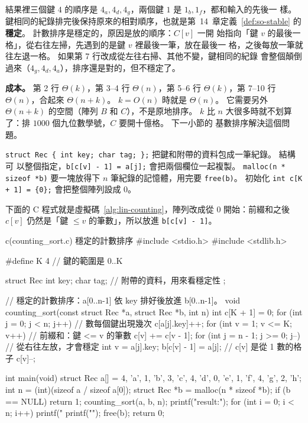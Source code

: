 結果裡三個鍵 $4$ 的順序是 $4_a, 4_d, 4_g$，兩個鍵 $1$ 是 $1_b, 1_f$，都和輸入的先後一
樣。 鍵相同的紀錄排完後保持原來的相對順序，也就是第~14~章定義~\ref{def:so-stable}
的\textbf{穩定}。 計數排序是穩定的，原因是放的順序：$C[v]$ 一開
始指向「鍵 $v$ 的最後一格」，從右往左掃，先遇到的是鍵 $v$ 裡最後一筆，放在最後一
格，之後每放一筆就往左退一格。 如果第 7 行改成從左往右掃、其他不變，鍵相同的紀錄
會整個顛倒過來（$4_g, 4_d, 4_a$），排序還是對的，但不穩定了。

\textbf{成本。} 第 2 行 $\Theta(k)$，第 3--4 行 $\Theta(n)$，第 5--6 行
$\Theta(k)$，第 7--10 行 $\Theta(n)$，合起來 $\Theta(n + k)$。 $k = O(n)$ 時就是
$\Theta(n)$。 它需要另外 $\Theta(n + k)$ 的空間（陣列 $B$ 和 $C$），不是原地排序。
$k$ 比 $n$ 大很多時就不划算了：排 $1000$ 個九位數學號，$C$ 要開十億格。 下一小節的
基數排序解決這個問題。

\begin{cbookrecap}[第~14~章結構、第~19~章 19.3 節]
\texttt{struct Rec \{ int key; char tag; \};} 把鍵和附帶的資料包成一筆紀錄。 結構可
以整個指定，\texttt{b[c[v] - 1] = a[j];} 會把兩個欄位一起複製。
\texttt{malloc(n * sizeof *b)} 要一塊放得下 $n$ 筆紀錄的記憶體，用完要
\texttt{free(b)}。 初始化 \texttt{int c[K + 1] = \{0\};} 會把整個陣列設成 $0$。
\end{cbookrecap}

下面的 C 程式就是虛擬碼~\ref{alg:lin-counting}，陣列改成從 $0$ 開始：前綴和之後
$c[v]$ 仍然是「鍵 $\le v$ 的筆數」，所以放進 \texttt{b[c[v] - 1]}。

\begin{example}[label=ex:lin-counting]{c}{(counting\_sort.c) 穩定的計數排序}
#include <stdio.h>
#include <stdlib.h>

#define K 4                       // 鍵的範圍是 0..K

struct Rec {
    int key;
    char tag;                     // 附帶的資料，用來看穩定性
};

// 穩定的計數排序：a[0..n-1] 依 key 排好後放進 b[0..n-1]。
void counting_sort(const struct Rec *a, struct Rec *b, int n)
{
    int c[K + 1] = {0};
    for (int j = 0; j < n; j++)          // 數每個鍵出現幾次
        c[a[j].key]++;
    for (int v = 1; v <= K; v++)         // 前綴和：鍵 <= v 的筆數
        c[v] += c[v - 1];
    for (int j = n - 1; j >= 0; j--) {   // 從右往左放，才會穩定
        int v = a[j].key;
        b[c[v] - 1] = a[j];              // c[v] 是從 1 數的格子
        c[v]--;
    }
}

int main(void)
{
    struct Rec a[] = {{4, 'a'}, {1, 'b'}, {3, 'c'}, {4, 'd'},
                      {0, 'e'}, {1, 'f'}, {4, 'g'}, {2, 'h'}};
    int n = (int)(sizeof a / sizeof a[0]);
    struct Rec *b = malloc(n * sizeof *b);
    if (b == NULL)
        return 1;
    counting_sort(a, b, n);
    printf("result:");
    for (int i = 0; i < n; i++)
        printf(" %
    printf("\n");
    free(b);
    return 0;
}
\end{example}

